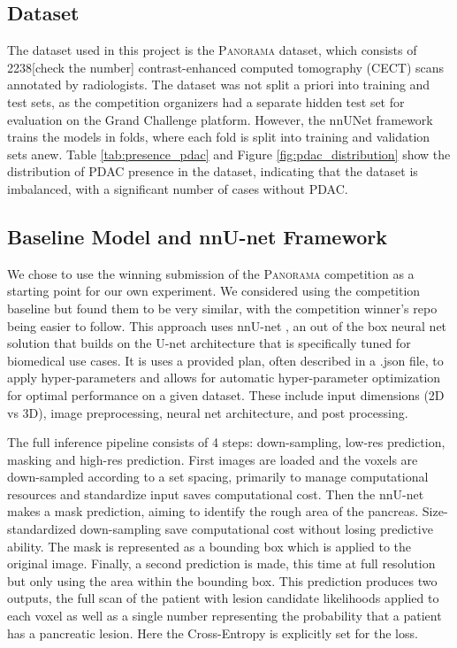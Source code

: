\documentclass[conference]{IEEEtran}
\begin{document}
\subsection{Dataset}
The dataset used in this project is the \textsc{Panorama} dataset, which consists of 2238[check the number] contrast-enhanced computed tomography (CECT) scans annotated by radiologists. The dataset was not split a priori into training and test sets, as the competition organizers had a separate hidden test set for evaluation on the Grand Challenge platform. However, the nnUNet framework trains the models in folds, where each fold is split into training and validation sets anew. Table \ref{tab:presence_pdac} and Figure \ref{fig:pdac_distribution} show the distribution of PDAC presence in the dataset, indicating that the dataset is imbalanced, with a significant number of cases without PDAC.
\subsection{Baseline Model and nnU-net Framework} 
We chose to use the winning submission of the \textsc{Panorama} competition as a starting point for our own experiment. We considered using the competition baseline but found them to be very similar, with the competition winner's repo being easier to follow. This approach uses nnU-net \cite{b1}, an out of the box neural net solution that builds on the U-net architecture that is specifically tuned for biomedical use cases. It is uses a provided plan, often described in a .json file, to apply hyper-parameters and allows for automatic hyper-parameter optimization for optimal performance on a given dataset. These include input dimensions (2D vs 3D), image preprocessing, neural net architecture, and post processing.

The full inference pipeline consists of 4 steps: down-sampling, low-res prediction, masking and high-res prediction. First images are loaded and the voxels are down-sampled according to a set spacing, primarily to manage computational resources and standardize input saves computational cost. Then the nnU-net makes a mask prediction, aiming to identify the rough area of the pancreas. Size-standardized down-sampling save computational cost without losing predictive ability. The mask is represented as a bounding box which is applied to the original image. Finally, a second prediction is made, this time at full resolution but only using the area within the bounding box. This prediction produces two outputs, the full scan of the patient with lesion candidate likelihoods applied to each voxel as well as a single number representing the probability that a patient has a pancreatic lesion. Here the Cross-Entropy is explicitly set for the loss.
\end{document}

